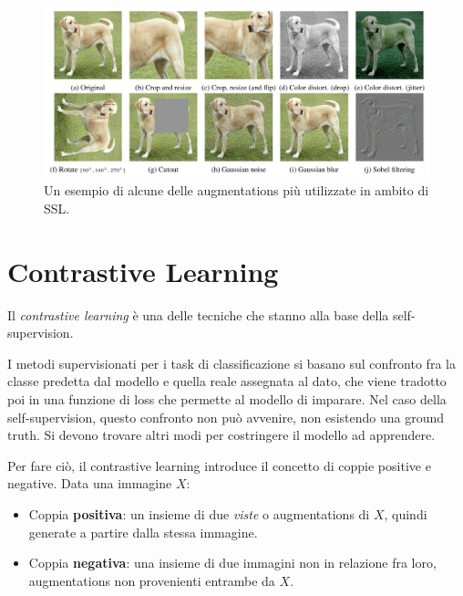 \vspace{5mm}
\begin{figure}[hb]
    \centering
    \includegraphics[width=\textwidth]{Immagini/ssl/augmentations.png}
    \caption{Un esempio di alcune delle augmentations più utilizzate in ambito di SSL.}
    \label{fig:augmentations}
\end{figure}

\section{Contrastive Learning}
Il \textit{contrastive learning} è una delle tecniche che stanno alla base della self-supervision.

I metodi supervisionati per i task di classificazione si basano sul confronto fra la classe predetta dal modello e quella reale assegnata al dato, che viene tradotto poi in una funzione di loss che permette al modello di imparare. Nel caso della self-supervision, questo confronto non può avvenire, non esistendo una ground truth. Si devono trovare altri modi per costringere il modello ad apprendere.

Per fare ciò, il contrastive learning introduce il concetto di coppie positive e negative. Data una immagine \(X\):
\begin{itemize}
    \item Coppia \textbf{positiva}: un insieme di due \textit{viste} o augmentations di \(X\), quindi generate a partire dalla stessa immagine.
    \item Coppia \textbf{negativa}: una insieme di due immagini non in relazione fra loro, augmentations non provenienti entrambe da \(X\).
\end{itemize}

